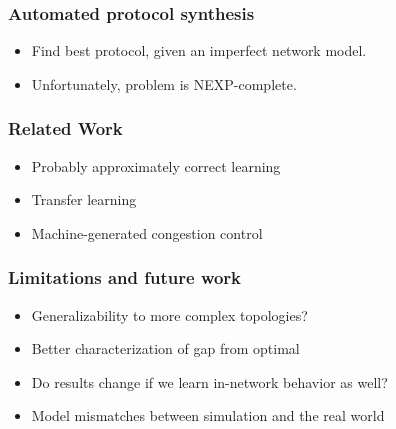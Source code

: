 \documentclass[svgnames]{beamer}
\begin{document}
\begin{Large}
\begin{frame}
\frametitle{Automated protocol synthesis}
\begin{itemize}
\item Find best protocol, given an imperfect network model.
\item Unfortunately, problem is NEXP-complete. 
\end{itemize}
\end{frame}











\begin{frame}
\frametitle{Related Work}
\begin{itemize}
\item Probably approximately correct learning
\item Transfer learning
\item Machine-generated congestion control
\end{itemize}
\end{frame}

\begin{frame}
\frametitle{Limitations and future work}
\begin{itemize}
\item Generalizability to more complex topologies?
\item Better characterization of gap from optimal
\item Do results change if we learn in-network behavior as well?
\item Model mismatches between simulation and the real world
\end{itemize}
\end{frame}
\end{Large}
\end{document}
